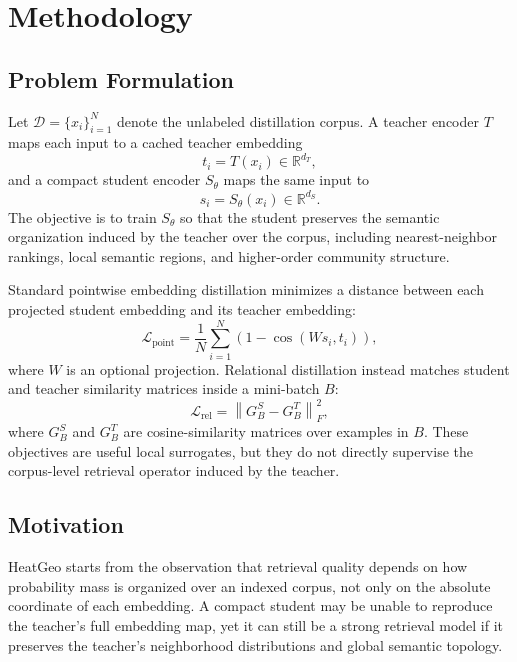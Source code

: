 \section{Methodology}
\label{sec:method}

\subsection{Problem Formulation}

Let $\mathcal{D}=\{x_i\}_{i=1}^{N}$ denote the unlabeled distillation corpus. A teacher encoder $T$ maps each input to a cached teacher embedding
\begin{equation}
    t_i = T(x_i) \in \mathbb{R}^{d_T},
\end{equation}
and a compact student encoder $S_{\theta}$ maps the same input to
\begin{equation}
    s_i = S_{\theta}(x_i) \in \mathbb{R}^{d_S}.
\end{equation}
The objective is to train $S_{\theta}$ so that the student preserves the semantic organization induced by the teacher over the corpus, including nearest-neighbor rankings, local semantic regions, and higher-order community structure.

Standard pointwise embedding distillation minimizes a distance between each projected student embedding and its teacher embedding:
\begin{equation}
    \mathcal{L}_{\mathrm{point}}
    =
    \frac{1}{N}
    \sum_{i=1}^{N}
    \left(1-\cos(Ws_i,t_i)\right),
\end{equation}
where $W$ is an optional projection. Relational distillation instead matches student and teacher similarity matrices inside a mini-batch $B$:
\begin{equation}
    \mathcal{L}_{\mathrm{rel}}
    =
    \left\|
    G_B^S - G_B^T
    \right\|_F^2,
\end{equation}
where $G_B^S$ and $G_B^T$ are cosine-similarity matrices over examples in $B$. These objectives are useful local surrogates, but they do not directly supervise the corpus-level retrieval operator induced by the teacher.

\subsection{Motivation}

HeatGeo starts from the observation that retrieval quality depends on how probability mass is organized over an indexed corpus, not only on the absolute coordinate of each embedding. A compact student may be unable to reproduce the teacher's full embedding map, yet it can still be a strong retrieval model if it preserves the teacher's neighborhood distributions and global semantic topology.

